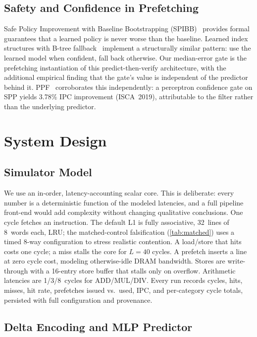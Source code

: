 \documentclass[conference]{IEEEtran}
\begin{document}
\subsection{Safety and Confidence in Prefetching}

Safe Policy Improvement with Baseline Bootstrapping (SPIBB)~\cite{laroche2019}
provides formal guarantees that a learned policy is never worse than the
baseline. Learned index structures with B-tree fallback~\cite{kraska2018}
implement a structurally similar pattern: use the learned model when confident,
fall back otherwise. Our median-error gate is the prefetching instantiation of
this predict-then-verify architecture, with the additional empirical finding
that the gate's value is independent of the predictor behind it.
PPF~\cite{ppf} corroborates this independently: a perceptron confidence
gate on SPP yields 3.78\% IPC improvement (ISCA~2019), attributable to
the filter rather than the underlying predictor.

\section{System Design}
\label{sec:design}

\subsection{Simulator Model}
\label{sec:simulator}

We use an in-order, latency-accounting scalar core. This is deliberate:
every number is a deterministic function of the modeled latencies, and a
full pipeline front-end would add complexity without changing qualitative
conclusions. One cycle fetches an instruction. The default L1 is fully
associative, 32~lines of 8~words each, LRU; the matched-control
falsification (\cref{tab:matched}) uses a timed 8-way configuration to
stress realistic contention. A load/store that hits costs one cycle; a
miss stalls the core for $L = 40$ cycles. A prefetch inserts a line at zero
cycle cost, modeling otherwise-idle DRAM bandwidth. Stores are write-through
with a 16-entry store buffer that stalls only on overflow. Arithmetic
latencies are 1/3/8~cycles for ADD/MUL/DIV. Every run records cycles, hits,
misses, hit rate, prefetches issued vs.\ used, IPC, and per-category cycle
totals, persisted with full configuration and provenance.

\subsection{Delta Encoding and MLP Predictor}
\label{sec:predictor}
\end{document}
